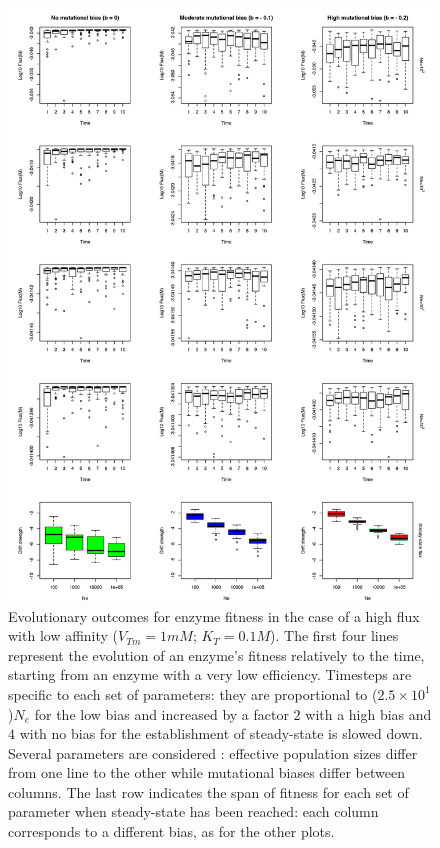 \begin{figure}[h!]
\vspace{-0.5cm}
\begin{center}
\includegraphics[scale=0.5,trim=0cm 0cm 0cm 0cm,clip]{pics/SM-Enzymes/Evo_SteadyState_HighF.jpeg} 
\vspace{-0.1cm}
\caption{\small Evolutionary outcomes for enzyme fitness in the case of a high flux with low affinity ($V_{Tm}=1mM$; $K_T=0.1M$). The first four lines represent the evolution of an enzyme's fitness relatively to the time, starting from an enzyme with a very low efficiency. Timesteps are specific to each set of parameters: they are proportional to ($2.5\times 10^1$)$N_e$ for the low bias and increased by a factor $2$ with a high bias and $4$ with no bias for the establishment of steady-state is slowed down. Several parameters are considered : effective population sizes differ from one line to the other while mutational biases differ between columns. The last row indicates the span of fitness for each set of parameter when steady-state has been reached: each column corresponds to a different bias, as for the other plots.}
\label{fig5b-ann}
\end{center}
\end{figure}


